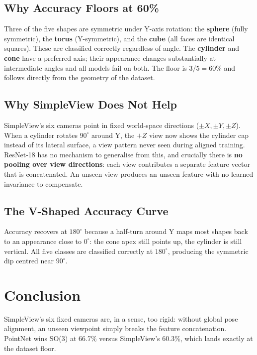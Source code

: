 \documentclass[12pt,a4paper]{article}
\begin{document}
\subsection*{Why Accuracy Floors at 60\%}

Three of the five shapes are symmetric under Y-axis rotation: the \textbf{sphere} (fully symmetric), the \textbf{torus} (Y-symmetric), and the \textbf{cube} (all faces are identical squares). These are classified correctly regardless of angle. The \textbf{cylinder} and \textbf{cone} have a preferred axis; their appearance changes substantially at intermediate angles and all models fail on both. The floor is $3/5 = 60\%$ and follows directly from the geometry of the dataset.

\subsection*{Why SimpleView Does Not Help}

SimpleView's six cameras point in fixed world-space directions ($\pm X, \pm Y, \pm Z$). When a cylinder rotates $90^\circ$ around Y, the $+Z$ view now shows the cylinder cap instead of its lateral surface, a view pattern never seen during aligned training. ResNet-18 has no mechanism to generalise from this, and crucially there is \textbf{no pooling over view directions}: each view contributes a separate feature vector that is concatenated. An unseen view produces an unseen feature with no learned invariance to compensate.

\subsection*{The V-Shaped Accuracy Curve}

Accuracy recovers at $180^\circ$ because a half-turn around Y maps most shapes back to an appearance close to $0^\circ$: the cone apex still points up, the cylinder is still vertical. All five classes are classified correctly at $180^\circ$, producing the symmetric dip centred near $90^\circ$.

\section{Conclusion}

SimpleView's six fixed cameras are, in a sense, too rigid: without global pose alignment, an unseen viewpoint simply breaks the feature concatenation. PointNet wins SO(3) at 66.7\% versus SimpleView's 60.3\%, which lands exactly at the dataset floor.
\end{document}
